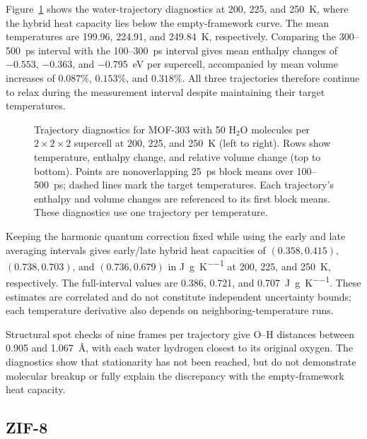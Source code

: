 \documentclass[12pt,a4paper]{article}
\numberwithin{equation}{section}
\begin{document}
Figure~\ref{fig:water-diagnostics-mof303} shows the water-trajectory
diagnostics at 200, 225, and \SI{250}{K}, where the hybrid heat capacity
lies below the empty-framework curve. The mean temperatures are 199.96,
224.91, and \SI{249.84}{K}, respectively. Comparing the
300--\SI{500}{ps} interval with the 100--\SI{300}{ps} interval gives
mean enthalpy changes of $-0.553$, $-0.363$, and \SI{-0.795}{eV}
per supercell, accompanied by mean volume increases of $0.087\%$,
$0.153\%$, and $0.318\%$. All three trajectories therefore continue
to relax during the measurement interval despite maintaining their
target temperatures.

\begin{figure}[htbp]
  \centering
  
  \caption{Trajectory diagnostics for MOF-303 with 50 H$_2$O molecules
  per $2\times2\times2$ supercell at 200, 225, and \SI{250}{K}
  (left to right). Rows show temperature, enthalpy change, and relative
  volume change (top to bottom). Points are nonoverlapping \SI{25}{ps} block means over
  100--\SI{500}{ps}; dashed lines mark the target temperatures.
  Each trajectory's enthalpy and volume changes are referenced to its
  first block means. These diagnostics use one trajectory per temperature.}
  \label{fig:water-diagnostics-mof303}
\end{figure}

Keeping the harmonic quantum correction fixed while using the early
and late averaging intervals gives early/late hybrid heat capacities of
$(0.358,0.415)$, $(0.738,0.703)$, and $(0.736,0.679)$ in
\si{J\per g\per K} at 200, 225, and \SI{250}{K}, respectively. The full-interval values
are 0.386, 0.721, and \SI{0.707}{J\per g\per K}. These estimates
are correlated and do not constitute independent uncertainty bounds;
each temperature derivative also depends on neighboring-temperature runs.

Structural spot checks of nine frames per trajectory give O--H distances
between 0.905 and \SI{1.067}{\angstrom}, with each water hydrogen
closest to its original oxygen. The diagnostics show that stationarity
has not been reached, but do not demonstrate molecular breakup or fully
explain the discrepancy with the empty-framework heat capacity.

\FloatBarrier
\subsection{ZIF-8}
\label{sec:zif8-results}
\end{document}
